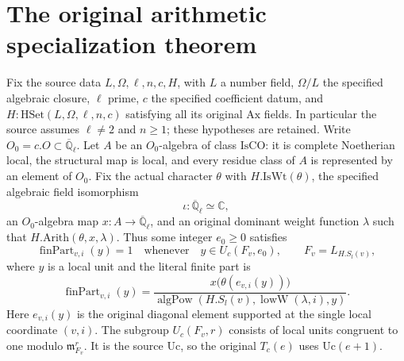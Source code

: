 \section{The original arithmetic specialization theorem}
\label{sec:arithmetic-specialization-v42}


Fix the source data $L,\mathcal\Omega,\ell,n,c,H$, with
$L$ a number field, $\mathcal\Omega/L$ the specified algebraic
closure, $\ell$ prime, $c$ the specified coefficient datum,
and $H:\mathrm{HSet}(L,\mathcal\Omega,\ell,n,c)$ satisfying
all its original $\mathrm{Ax}$ fields.  In particular the
source assumes $\ell\ne2$ and $n\geq1$; these hypotheses
are retained.  Write $O_0=c.O\subset\overline{\mathbb Q}_\ell$.
Let $A$ be an $O_0$-algebra of class $\mathrm{IsCO}$:
it is complete Noetherian local, the structural map is local,
and every residue class of $A$ is represented by an element
of $O_0$.  Fix the actual character $\theta$ with
$H.\mathrm{IsWt}(\theta)$, the specified algebraic field
isomorphism
\[
             \iota:\overline{\mathbb Q}_\ell\simeq\mathbb C,
\]
an $O_0$-algebra map $x:A\to\overline{\mathbb Q}_\ell$,
and an original dominant weight function $\lambda$ such that
$H.\mathrm{Arith}(\theta,x,\lambda)$.
Thus some integer $e_0\geq0$ satisfies
\begin{equation}\label{eq:asp-arithmetic}
 \operatorname{finPart}_{v,i}(y)=1
 \quad\text{whenever}\quad y\in U_c(F_v,e_0),
 \qquad F_v=L_{H.S_l(v)},
\end{equation}
where $y$ is a local unit and the literal finite part is
\begin{equation}\label{eq:asp-finpart}
 \operatorname{finPart}_{v,i}(y)=
       \frac{x\bigl(\theta(e_{v,i}(y))\bigr)}
       {\operatorname{algPow}(H.S_l(v),
                                   \operatorname{lowW}(\lambda,i),y)}.
\end{equation}
Here $e_{v,i}(y)$ is the original diagonal element supported
at the single local coordinate $(v,i)$.  The subgroup
$U_c(F_v,r)$ consists of local units congruent to one
modulo $\mathfrak m_{F_v}^r$.  It is the source $\mathrm{Uc}$,
so the original $T_c(e)$ uses $\mathrm{Uc}(e+1)$.

